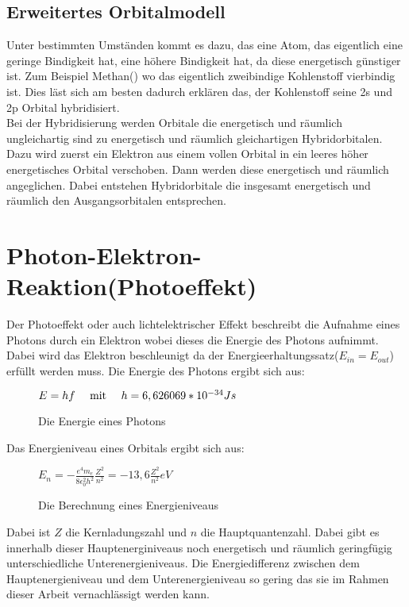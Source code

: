 \documentclass[11pt,a4paper,oneside]{report}
\begin{document}
\subsection{Erweitertes Orbitalmodell}
Unter bestimmten Umständen kommt es dazu, das eine Atom, das eigentlich eine geringe Bindigkeit hat, eine höhere Bindigkeit hat, da diese energetisch günstiger ist. Zum Beispiel Methan() wo das eigentlich zweibindige Kohlenstoff vierbindig ist. Dies läst sich am besten dadurch erklären das, der Kohlenstoff seine 2s und 2p Orbital hybridisiert.
\\
Bei der Hybridisierung werden Orbitale die energetisch und räumlich ungleichartig sind zu energetisch und räumlich gleichartigen Hybridorbitalen. Dazu wird zuerst ein Elektron aus einem vollen Orbital in ein leeres höher energetisches Orbital verschoben. Dann werden diese energetisch und räumlich angeglichen. Dabei entstehen Hybridorbitale die insgesamt energetisch und räumlich den Ausgangsorbitalen entsprechen.\cite[S. 100ff]{riedel08}

\section{Photon-Elektron-Reaktion(Photoeffekt)}
Der Photoeffekt oder auch lichtelektrischer Effekt beschreibt die Aufnahme eines Photons durch ein Elektron wobei dieses die Energie des Photons aufnimmt.\cite{stroppe08} Dabei wird das Elektron beschleunigt da der Energieerhaltungssatz($E_{in}=E_{out}$) erfüllt werden muss. 
Die Energie des Photons ergibt sich aus: 

\begin{figure}[h]
\centering
$E=hf \text{\hspace{1em} mit \hspace{1em}} h=6,626069*10^{-34}Js$
\caption{Die Energie eines Photons\cite[S. 421]{stroppe08}}
\end{figure}

Das Energieniveau eines Orbitals ergibt sich aus:
\begin{figure}[h]
\centering
$E_n=-\frac{e^4m_e}{8\epsilon_0^2h^2}\frac{Z^2}{n^2}=-13,6\frac{Z^2}{n^2}eV$
\caption{Die Berechnung eines Energieniveaus\cite[S.439]{stroppe08}}
\end{figure}
Dabei ist $Z$ die Kernladungszahl und $n$ die Hauptquantenzahl. Dabei gibt es innerhalb dieser Hauptenerginiveaus noch energetisch und räumlich geringfügig unterschiedliche Unterenergieniveaus. Die Energiedifferenz zwischen dem Hauptenergieniveau und dem Unterenergieniveau so gering das sie im Rahmen dieser Arbeit vernachlässigt werden kann.
\end{document}
